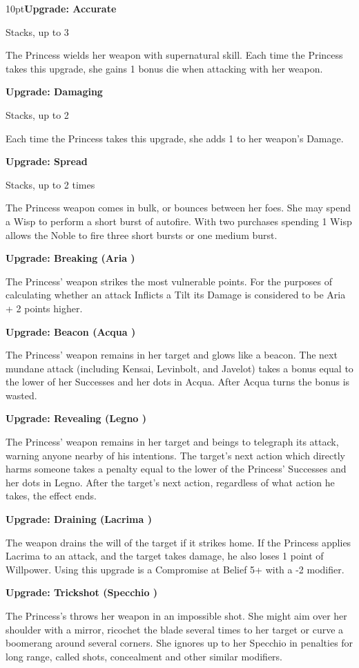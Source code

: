 \begin{myindentpar}{10pt}\textbf{Upgrade: Accurate}

Stacks, up to 3

The Princess wields her weapon with supernatural skill. Each time the Princess takes this upgrade, she gains 1 bonus die when attacking with her weapon.

\textbf{Upgrade: Damaging}

Stacks, up to 2

Each time the Princess takes this upgrade, she adds 1 to her weapon’s Damage. 

\textbf{Upgrade: Spread}

Stacks, up to 2 times

The Princess weapon comes in bulk, or bounces between her foes. She may spend a Wisp to perform a short burst of autofire. With two purchases spending 1 Wisp allows the Noble to fire three short bursts or one medium burst. 

\textbf{Upgrade: Breaking (Aria \textbullet\textbullet)}

The Princess' weapon strikes the most vulnerable points. For the purposes of calculating whether an attack Inflicts a Tilt its Damage is considered to be Aria + 2 points higher. 

\textbf{Upgrade: Beacon (Acqua \textbullet\textbullet)}

The Princess' weapon remains in her target and glows like a beacon. The next mundane attack (including Kensai, Levinbolt, and Javelot) takes a bonus equal to the lower of her Successes and her dots in Acqua. After Acqua turns the bonus is wasted. 

\textbf{Upgrade: Revealing (Legno \textbullet\textbullet)}

The Princess' weapon remains in her target and beings to telegraph its attack, warning anyone nearby of his intentions. The target's next action which directly harms someone takes a penalty equal to the lower of the Princess' Successes and her dots in Legno. After the target's next action, regardless of what action he takes, the effect ends. 

\textbf{Upgrade: Draining (Lacrima \textbullet\textbullet)}

The weapon drains the will of the target if it strikes home. If the Princess applies Lacrima to an attack, and the target takes damage, he also loses 1 point of Willpower. Using this upgrade is a Compromise at Belief 5+ with a -2 modifier.

\textbf{Upgrade: Trickshot (Specchio \textbullet\textbullet)}

The Princess's throws her weapon in an impossible shot. She might aim over her shoulder with a mirror, ricochet the blade several times to her target or curve a boomerang around several corners. She ignores up to her Specchio in penalties for long range, called shots, concealment and other similar modifiers.

\end{myindentpar}

